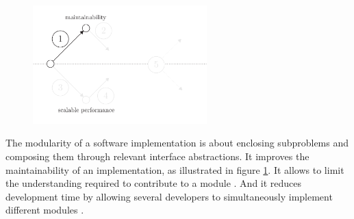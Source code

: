 \begin{figure}[h!] \label{fig:modular-programming-state-of-the-art}
\begin{center}
\includegraphics[width=0.6\textwidth]{../ressources/state-of-the-art-1.pdf}
\end{center}
\end{figure}

The modularity of a software implementation is about enclosing subproblems and composing them through relevant interface abstractions.
It improves the maintainability of an implementation, as illustrated in figure \ref{fig:modular-programming-state-of-the-art}.
It allows to limit the understanding required to contribute to a module \cite{Stevens1974}.
And it reduces development time by allowing several developers to simultaneously implement different modules \cite{Wong2009,Cataldo2006}.






